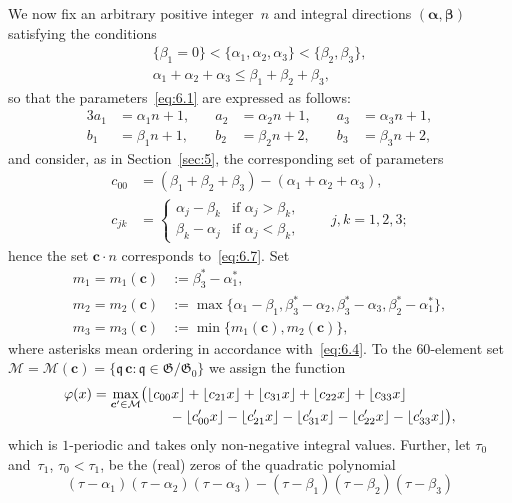 \documentclass[a4paper,twoside]{article}
\numberwithin{equation}{section}
\renewcommand{\[}{\lfloor}
\renewcommand{\]}{\rfloor}
\newcommand{\<}{\langle}
\renewcommand{\>}{\rangle}
\renewcommand{\phi}{\varphi}
\newcommand{\bc}{\boldsymbol c}
\newcommand{\balpha}{\boldsymbol\alpha}
\newcommand{\bbeta}{\boldsymbol\beta}
\newcommand{\fq}{\mathfrak q}
\newcommand{\fG}{\mathfrak G}
\newcommand{\sM}{\mathcal M}
\begin{document}
We now fix an arbitrary positive integer~$n$ and
integral directions $(\balpha,\bbeta)$ satisfying the conditions
\begin{gather*}
\{\beta_1=0\}
<\{\alpha_1,\alpha_2,\alpha_3\}
<\{\beta_2,\beta_3\},
\\
\alpha_1+\alpha_2+\alpha_3
\le\beta_1+\beta_2+\beta_3,
\end{gather*}
so that the parameters~\eqref{eq:6.1} are expressed as follows:
\begin{equation}
\begin{alignedat}{3}{3}
a_1&=\alpha_1n+1, \quad&
a_2&=\alpha_2n+1, \quad&
a_3&=\alpha_3n+1,
\\
b_1&=\beta_1n+1, \quad&
b_2&=\beta_2n+2, \quad&
b_3&=\beta_3n+2,
\end{alignedat}
\label{eq:6.7}
\end{equation}
and consider, as in Section~\ref{sec:5},
the corresponding set of parameters
\begin{align*}
c_{00}&=(\beta_1+\beta_2+\beta_3)-(\alpha_1+\alpha_2+\alpha_3),
\\
c_{jk}&=\begin{cases}
\alpha_j-\beta_k & \mbox{if $\alpha_j>\beta_k$}, \\
\beta_k-\alpha_j & \mbox{if $\alpha_j<\beta_k$},
\end{cases}
\qquad j,k=1,2,3;
\end{align*}
hence the set $\bc\cdot n$ corresponds to~\eqref{eq:6.7}.
Set
\begin{align*}
m_1=m_1(\bc)
&:=\beta_3^*-\alpha_1^*,
\\
m_2=m_2(\bc)
&:=\max\{\alpha_1-\beta_1,
\beta_3^*-\alpha_2,\beta_3^*-\alpha_3,\beta_2^*-\alpha_1^*\},
\\
m_3=m_3(\bc)
&:=\min\{m_1(\bc),m_2(\bc)\},
\end{align*}
where asterisks mean ordering in accordance with~\eqref{eq:6.4}.
To the $60$-element set
$\sM=\sM(\bc)=\{\fq\,\bc:\fq\in\fG/\fG_0\}$
we assign the function
\begin{align*}
\phi(x)=\smash{\max_{\bc'\in\sM}}&\bigl(
\[c_{00}x\]+\[c_{21}x\]+\[c_{31}x\]+\[c_{22}x\]+\[c_{33}x\]
\\ &\qquad
-\[c_{00}'x\]-\[c_{21}'x\]-\[c_{31}'x\]-\[c_{22}'x\]-\[c_{33}'x\]\bigr),
\end{align*}
which is $1$-periodic and takes only non-negative integral values.
Further, let $\tau_0$ and~$\tau_1$, $\tau_0<\tau_1$, be
the (real) zeros  of the quadratic polynomial
$$
(\tau-\alpha_1)(\tau-\alpha_2)(\tau-\alpha_3)
-(\tau-\beta_1)(\tau-\beta_2)(\tau-\beta_3)
$$
\end{document}
